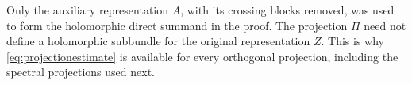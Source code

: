 Only the auxiliary representation $A$, with its crossing blocks removed,
was used to form the holomorphic direct summand in the proof.
The projection $\Pi$ need not define a holomorphic subbundle for the
original representation $Z$. This is why
\eqref{eq:projectionestimate} is available for every orthogonal
projection, including the spectral projections used next.
